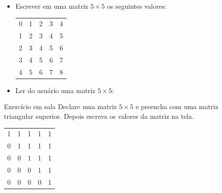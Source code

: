 \documentclass[portuguese,10pt,xcolor=table]{bredelebeamer}
\begin{document}
	\begin{frame}[c]
		\begin{center}
		\end{center}
	\end{frame} 
	\begin{frame}
		\begin{itemize}
			\item Escrever em uma matriz $5 \times 5$ os seguintes valores:
				\vspace{0.4cm}
				\begin{table}[]
					\centering
					\begin{tabular}{lllll}
						0 & 1 & 2 & 3 & 4 \\
						1 & 2 & 3 & 4 & 5 \\
						2 & 3 & 4 & 5 & 6 \\
						3 & 4 & 5 & 6 & 7 \\
						4 & 5 & 6 & 7 & 8
					\end{tabular}
				\end{table}
				
		\end{itemize}
	\end{frame}	
	\begin{frame}
		
		
	\end{frame}
	
	\begin{frame}[c]
		\begin{center}
			\structure{\large Exemplo 2}
		\end{center}
	\end{frame} 
	\begin{frame}
		\begin{itemize}
			\item Ler do usuário uma matriz $5 \times 5$:
				
		\end{itemize}
	\end{frame}	
		
	\begin{frame}
		\begin{alertblock}{ Exercício em sala}
			Declare uma matriz $5 \times 5$ e preencha com uma matriz triangular superior. Depois escreva os valores da matriz na tela.
			\begin{table}[]
				\centering
				\begin{tabular}{lllll}
					1 & 1 & 1 & 1 & 1 \\
					0 & 1 & 1 & 1 & 1 \\
					0 & 0 & 1 & 1 & 1 \\
					0 & 0 & 0 & 1 & 1 \\
					0 & 0 & 0 & 0 & 1
				\end{tabular}
			\end{table}
		\end{alertblock}
	\end{frame}
	
\end{document}
